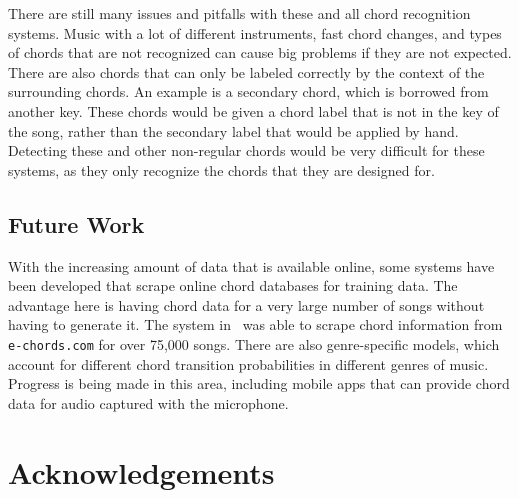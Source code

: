 \documentclass{sig-alternate}
\begin{document}
There are still many issues and pitfalls with these and all chord recognition systems. Music with a lot of different instruments, fast chord changes, and types of chords that are not recognized can cause big problems if they are not expected. There are also chords that can only be labeled correctly by the context of the surrounding chords. An example is a secondary chord, which is borrowed from another key. These chords would be given a chord label that is not in the key of the song, rather than the secondary label that would be applied by hand. Detecting these and other non-regular chords would be very difficult for these systems, as they only recognize the chords that they are designed for.    



\subsection{Future Work}

With the increasing amount of data that is available online, some systems have been developed that scrape online chord databases for training data. The advantage here is having chord data for a very large number of songs without having to generate it. The system in~\cite{McVicar:2010} was able to scrape chord information from \texttt{e-chords.com} for over 75,000 songs. There are also genre-specific models, which account for different chord transition probabilities in different genres of music. Progress is being made in this area, including mobile apps that can provide chord data for audio captured with the microphone.


\section{Acknowledgements}
\end{document}
